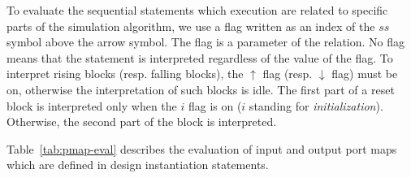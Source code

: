 To evaluate the sequential statements which execution are related to
specific parts of the simulation algorithm, we use a flag written as
an index of the $ss$ symbol above the arrow symbol. The flag is a
parameter of the relation. No flag means that the statement is
interpreted regardless of the value of the flag. To interpret rising
blocks (resp. falling blocks), the $\uparrow$ flag (resp. $\downarrow$
flag) must be on, otherwise the interpretation of such blocks is idle.
The first part of a reset block is interpreted only when the $i$ flag
is on ($i$ standing for \textit{initialization}). Otherwise, the
second part of the block is interpreted.

Table~\ref{tab:pmap-eval} describes the evaluation of input and output
port maps which are defined in design instantiation statements.

